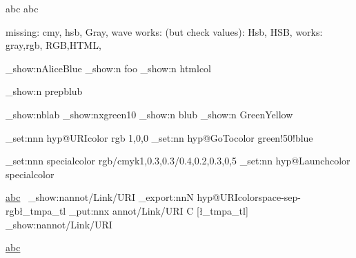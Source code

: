 \documentclass{article}
\begin{document}
\color{foo} abc \color{foo!!+} abc

\makeatletter

\expandafter\show\csname\string{}\endcsname

missing: cmy, hsb, Gray, wave
works: (but check values): Hsb, HSB,
works: gray,rgb, RGB,HTML,



\ExplSyntaxOn
\color_show:n{AliceBlue}
\color_show:n {foo}
\color_show:n {htmlcol}

\color_show:n {prepblub}

\color_show:n{blab}
\color_show:n{xgreen10}
\color_show:n {blub}
\color_show:n {GreenYellow}

\color_set:nnn { hyp@URIcolor } {rgb }{1,0,0}
\color_set:nn  { hyp@GoTocolor }   {green!50!blue }

\color_set:nnn { specialcolor }{rgb/cmyk}{1,0.3,0.3/0.4,0.2,0.3,0,5}
\color_set:nn  { hyp@Launchcolor }{specialcolor}

\url{abc}~
\pdfdict_show:n{annot/Link/URI}
\color_export:nnN {hyp@URIcolor}{space-sep-rgb}\l_tmpa_tl
\pdfdict_put:nnx
              {annot/Link/URI}
              { C }
              { [\l_tmpa_tl] }
\pdfdict_show:n{annot/Link/URI}

\url{abc}
\ExplSyntaxOff
\end{document}
